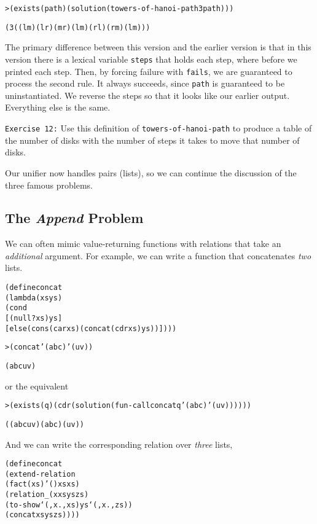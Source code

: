 \begin{alltt}
> (exists (path) (solution (towers-of-hanoi-path 3 path)))

(3 ((l m) (l r) (m r) (l m) (r l) (r m) (l m)))
\end{alltt}

The primary difference between this version and the earlier version is that
in this version there is a lexical variable \texttt{steps} that holds each
step, where before we printed each step.  Then, by forcing failure with
\texttt{fails}, we are guaranteed to process the second rule.  It always
succeeds, since \texttt{path} is guaranteed to be uninstantiated. We
reverse the steps so that it looks like our earlier output. Everything else
is the same.  

\texttt{Exercise 12:} Use this definition of
\texttt{towers-of-hanoi-path} to produce a table of the number of
disks with the number of steps it takes to move that number of disks.

Our unifier now handles pairs (lists), so we can continue the
discussion of the three famous problems.
\newpage
\subsection{The \emph{Append} Problem}

We can often mimic value-returning functions with relations
that take an \emph{additional} argument.  For example,  we
can write a function that concatenates \emph{two} lists.

\begin{alltt}
(define concat
  (lambda (xs ys)
    (cond
      [(null? xs) ys]
      [else (cons (car xs) (concat (cdr xs) ys))])))
\end{alltt}

\begin{alltt}
> (concat '(a b c) '(u v))

(a b c u v)
\end{alltt}

\noindent
or the equivalent

\begin{alltt}
> (exists (q) (cdr (solution (fun-call concat q '(a b c) '(u v))))))

((a b c u v) (a b c) (u v))
\end{alltt}

\noindent
And we can write the corresponding relation over \emph{three} lists,

\begin{alltt}
(define concat
  (extend-relation
    (fact (xs) '() xs xs)
    (relation _ (x xs ys zs)
      (to-show `(,x . ,xs) ys `(,x . ,zs))
      (concat xs ys zs))))
\end{alltt}        
\noindent

